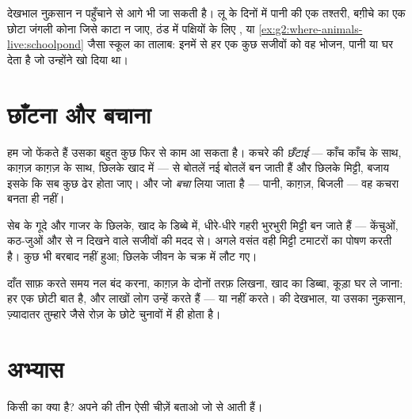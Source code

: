 \begin{example}\label{ex:g2:caring-for-nature:help}
देखभाल नुक़सान न पहुँचाने से आगे भी जा सकती है। लू के दिनों में पानी
की एक तश्तरी, बग़ीचे का एक छोटा जंगली कोना जिसे काटा न जाए, ठंड में
पक्षियों के लिए , या
\cref{ex:g2:where-animals-live:schoolpond} जैसा स्कूल का तालाब: इनमें
से हर एक कुछ सजीवों को वह भोजन, पानी या घर देता है जो उन्होंने खो
दिया था।
\end{example}

\section{छाँटना और बचाना}

\begin{proposition}\label{prop:g2:caring-for-nature:recycle}
हम जो फेंकते हैं उसका बहुत कुछ फिर से काम आ सकता है। कचरे की
\emph{छँटाई} --- काँच काँच के साथ, काग़ज़ काग़ज़
के साथ, छिलके खाद में --- से बोतलें नई बोतलें बन जाती हैं और छिलके
मिट्टी, बजाय इसके कि सब कुछ ढेर होता जाए। और जो \emph{बचा} लिया जाता
है --- पानी, काग़ज़, बिजली --- वह कचरा बनता ही नहीं।
\end{proposition}
\admitted

\begin{example}[खाद का डिब्बा]\label{ex:g2:caring-for-nature:compost}
सेब के गूदे और गाजर के छिलके, खाद के डिब्बे में, धीरे-धीरे गहरी
भुरभुरी मिट्टी बन जाते हैं --- केंचुओं, कठ-जुओं और  से न दिखने
वाले सजीवों की मदद से। अगले वसंत वही मिट्टी टमाटरों का पोषण करती है।
कुछ भी बरबाद नहीं हुआ; छिलके जीवन के चक्र में लौट गए।
\end{example}

\begin{remark}[छोटे हाथ भी गिनती में आते हैं]\label{rem:g2:caring-for-nature:count}
दाँत साफ़ करते समय नल बंद करना, काग़ज़ के दोनों तरफ़ लिखना, खाद का
डिब्बा, कूड़ा घर ले जाना: हर एक छोटी बात है, और लाखों लोग उन्हें करते
हैं --- या नहीं करते।  की देखभाल, या उसका नुक़सान, ज़्यादातर
तुम्हारे जैसे रोज़ के छोटे चुनावों में ही होता है।
\end{remark}

\section{अभ्यास}

\begin{exercise}[$\star$]\label{exo:g2:caring-for-nature:1}
किसी  का  क्या है? अपने  की तीन ऐसी चीज़ें बताओ जो
 से आती हैं।
\end{exercise}

